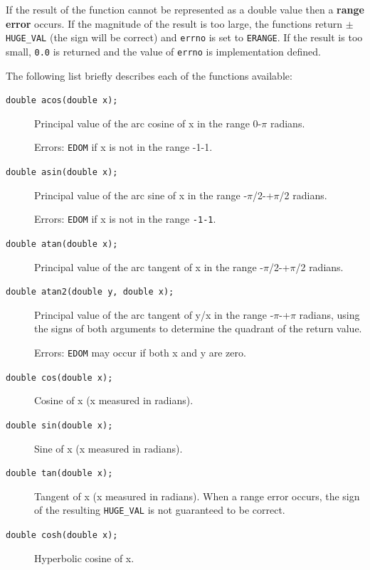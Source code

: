   If the result of the function cannot be represented as a double value then
   a \textbf{range error} occurs.  If the magnitude of the result is too
   large, the functions return \texttt{$\pm$HUGE\_VAL} (the sign will be
   correct) and \texttt{errno} is set to \texttt{ERANGE}.  If the
   result is too small, \texttt{0.0} is returned and the value of
   \texttt{errno} is implementation defined.


  The following list briefly describes each of the functions
   available:


  
  \begin{description}
   \item[\texttt{double acos(double x);}] Principal value of the arc cosine of x in the range
    0-$\pi$ radians.

    Errors: \texttt{EDOM} if x is not in the range
    -1-1.

   \item[\texttt{double asin(double x);}] Principal value of the arc sine of x in the range
    -$\pi$/2-+$\pi$/2 radians.

    Errors: \texttt{EDOM} if x is not in the range
    \texttt{-1-1}.

   \item[\texttt{double atan(double x);}] Principal value of the arc tangent of x in the range
    -$\pi$/2-+$\pi$/2 radians.

   \item[\texttt{double atan2(double y, double x);}] Principal value of the arc tangent of y/x in the range
    -$\pi$-+$\pi$ radians, using the signs of both arguments to
    determine the quadrant of the return value.

    Errors: \texttt{EDOM} may occur if both x and y
    are zero.

   \item[\texttt{double cos(double x);}] Cosine of x (x measured in radians).

   \item[\texttt{double sin(double x);}] Sine of x (x measured in radians).

   \item[\texttt{double tan(double x);}] Tangent of x (x measured in radians).  When a
    range error occurs, the sign of the resulting \texttt{HUGE\_VAL} is not
    guaranteed to be correct.

   \item[\texttt{double cosh(double x);}] Hyperbolic cosine of x.


\end{description}
